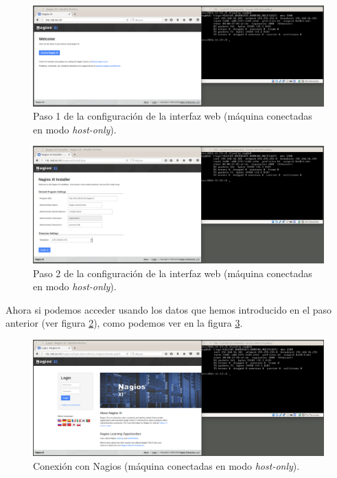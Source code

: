 \documentclass[a4paper,titlepage,12pt]{scrartcl}	%
\numberwithin{figure}{section} %
\numberwithin{table}{section} %
\begin{document}
	\begin{figure}[H]
		\includegraphics[width=\linewidth]{./Imagenes/O2-web1.png}
		\vspace{-0.5cm}
		\caption[Paso 1 de la configuración de la interfaz web (máquina conectadas en modo \textit{host-only}).]{Paso 1 de la configuración de la interfaz web (máquina conectadas en modo \textit{host-only}).}
		\label{O2-web1}
	\end{figure}
	
	\begin{figure}[H]
		\includegraphics[width=\linewidth]{./Imagenes/O2-web2.png}
		\vspace{-0.5cm}
		\caption[Paso 2 de la configuración de la interfaz web (máquina conectadas en modo \textit{host-only}).]{Paso 2 de la configuración de la interfaz web (máquina conectadas en modo \textit{host-only}).}
		\label{O2-web2}
	\end{figure}
	
	Ahora si podemos acceder usando los datos que hemos introducido en el paso anterior (ver figura \ref{O2-web2}), como podemos ver en la figura \ref{O2-conexion2}.
	
	\begin{figure}[H]
		\includegraphics[width=\linewidth]{./Imagenes/O2-conexion2.png}
		\vspace{-0.5cm}
		\caption[Conexión con Nagios (máquina conectadas en modo \textit{host-only}).]{Conexión con Nagios (máquina conectadas en modo \textit{host-only}).}
		\label{O2-conexion2}
	\end{figure}
	
\end{document}
